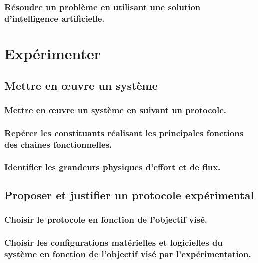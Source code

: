 \documentclass[10pt,fleqn]{book}
\newcommand{\repRel}{../..}
\newcommand{\repStyle}{\repRel/Style}
\newcommand{\td}{fichier_td}
\newcommand{\repExos}{\repRel/ExercicesCompetences}
\newcommand{\repExo}{dossier}
\begin{document}
\renewcommand{\repExo}{\repExos/C3_ResolutionNumerique/C3_02_Euler/1023_Euler}
\renewcommand{\td}{1023_Euler}
\graphicspath{{\repStyle/png/}{\repExo/images/}}


\subsection{Résoudre un problème en utilisant une solution d'intelligence artificielle. } 

\chapter{Expérimenter} 

\section{Mettre en œuvre un système} 

\subsection{Mettre en œuvre un système en suivant un protocole.} 

\subsection{Repérer les constituants réalisant les principales fonctions des chaines fonctionnelles.} 

\subsection{Identifier les grandeurs physiques d’effort et de flux.} 

\section{Proposer et justifier un protocole expérimental} 

\subsection{Choisir le protocole en fonction de l'objectif visé.} 

\subsection{Choisir les configurations matérielles et logicielles du système en fonction de l'objectif visé par l'expérimentation.} 
\end{document}
